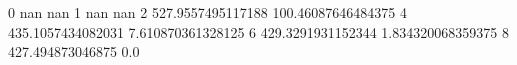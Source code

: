 0 nan nan
1 nan nan
2 527.9557495117188 100.46087646484375
4 435.1057434082031 7.610870361328125
6 429.3291931152344 1.834320068359375
8 427.494873046875 0.0
